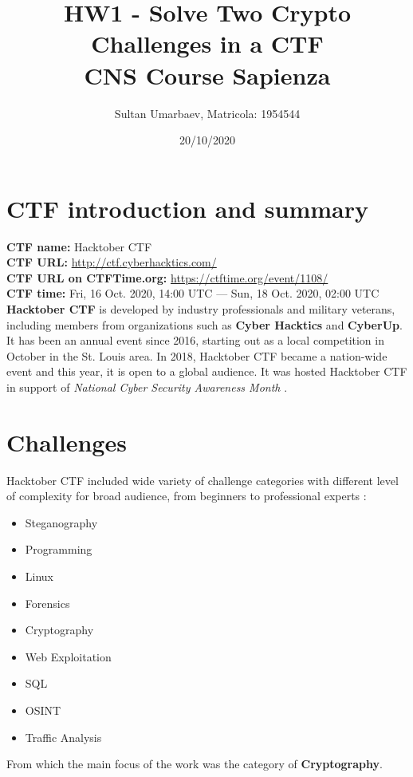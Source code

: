 \documentclass[11 pt]{article}
\title{
    HW1 - Solve Two Crypto Challenges in a CTF \\
    \large CNS Course Sapienza
}
\author{Sultan Umarbaev, Matricola: 1954544}
\date{20/10/2020}
\begin{document}
\maketitle

\section{CTF introduction and summary}
\textbf{CTF name:} Hacktober CTF \\
\textbf{CTF URL:} \url{http://ctf.cyberhacktics.com/} \\
\textbf{CTF URL on CTFTime.org:} \url{https://ctftime.org/event/1108/} \\
\textbf{CTF time:} Fri, 16 Oct. 2020, 14:00 UTC — Sun, 18 Oct. 2020, 02:00 UTC
\newline
\newline
\textbf{Hacktober CTF} is developed by industry professionals and military veterans, including members from organizations such as \textbf{Cyber Hacktics} and \textbf{CyberUp}. It has been an annual event since 2016, starting out as a local competition in October in the St. Louis area. In 2018, Hacktober CTF became a nation-wide event and this year, it is open to a global audience. It was hosted Hacktober CTF in support of \textit{National Cyber Security Awareness Month} \cite{HacktoberCTF Blog}. 

\section{Challenges}
Hacktober CTF included wide variety of challenge categories with different level of complexity for broad audience, from beginners to professional experts \cite{HacktoberCTF Blog}:
\begin{itemize}
	\item Steganography
	\item Programming
	\item Linux
	\item Forensics
	\item Cryptography
	\item Web Exploitation
	\item SQL
	\item OSINT
	\item Traffic Analysis
\end{itemize}
From which the main focus of the work was the category of \textbf{Cryptography}.

\end{document}
